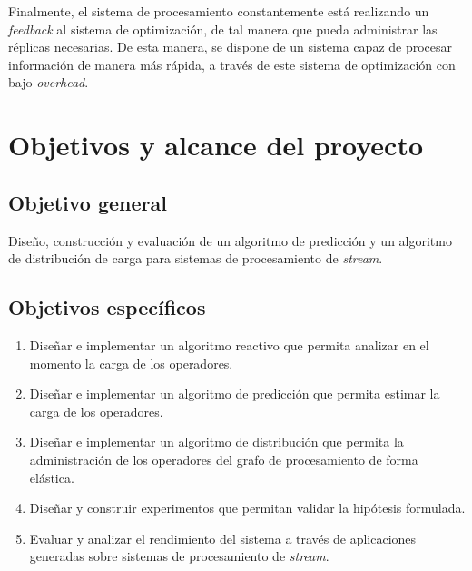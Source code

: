 Finalmente, el sistema de procesamiento constantemente está realizando un \textit{feedback} al sistema de optimización, de tal manera que pueda administrar las réplicas necesarias. De esta manera, se dispone de un sistema capaz de procesar información de manera más rápida, a través de este sistema de optimización con bajo \textit{overhead}.


\section{Objetivos y alcance del proyecto}
\label{intro:objetivos}

\subsection{Objetivo general}
	Dise\~no, construcción y evaluaci\'on de un algoritmo de predicci\'on y un algoritmo de distribuci\'on de carga para sistemas de procesamiento de \textit{stream}.

\subsection{Objetivos específicos}
\begin{enumerate}
	\item Dise\~nar e implementar un algoritmo reactivo que permita analizar en el momento la carga de los operadores.
	\item Dise\~nar e implementar un algoritmo de predicci\'on que permita estimar la carga de los operadores.
	\item Dise\~nar e implementar un algoritmo de distribuci\'on que permita la administraci\'on de los operadores del grafo de procesamiento de forma el\'astica.
	\item Dise\~nar y construir experimentos que permitan validar la hip\'otesis formulada.
	\item Evaluar y analizar el rendimiento del sistema a trav\'es de aplicaciones generadas sobre sistemas de procesamiento de \textit{stream}.
\end{enumerate}

